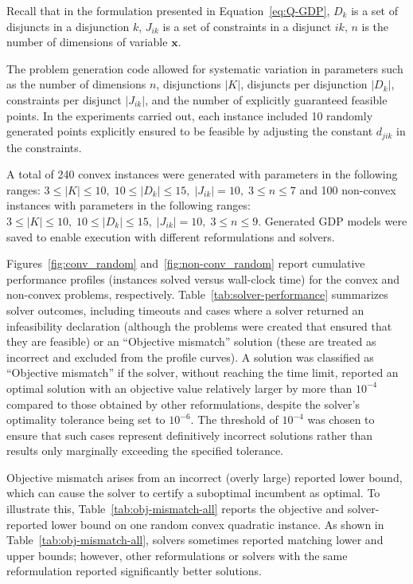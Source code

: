\documentclass[11pt]{article}
\begin{document}
Recall that in the formulation presented in Equation~\eqref{eq:Q-GDP}, $D_k$ is a set of disjuncts in a disjunction $k$, $J_{ik}$ is a set of constraints in a disjunct $ik$, $n$ is the number of dimensions of variable $\mathbf{x}$.

The problem generation code allowed for systematic variation in parameters such as the number of dimensions \(n\), disjunctions \(|K|\), disjuncts per disjunction \(|D_k|\), constraints per disjunct \(|J_{ik}|\), and the number of explicitly guaranteed feasible points.
In the experiments carried out, each instance included 10 randomly generated points explicitly ensured to be feasible by adjusting the constant \(d_{jik}\) in the constraints.

A total of 240 convex instances were generated with parameters in the following ranges:
\(
3 \leq |K| \leq 10, \; 10 \leq |D_k| \leq 15, \; |J_{ik}| = 10, \; 3 \leq n \leq 7
\) and 100 non-convex instances with parameters in the following ranges: \(
3 \leq |K| \leq 10, \; 10 \leq |D_k| \leq 15, \; |J_{ik}| = 10, \; 3 \leq n \leq 9
\).
Generated GDP models were saved to enable execution with different reformulations and solvers.

Figures~\ref{fig:conv_random} and~\ref{fig:non-conv_random} report cumulative performance profiles (instances solved versus wall-clock time) for the convex and non-convex problems, respectively.
Table~\ref{tab:solver-performance} summarizes solver outcomes, including timeouts and cases where a solver returned an infeasibility declaration (although the problems were created that ensured that they are feasible) or an ``Objective mismatch'' solution (these are treated as incorrect and excluded from the profile curves).
A solution was classified as ``Objective mismatch'' if the solver, without reaching the time limit, reported an optimal solution with an objective value relatively larger by more than \(10^{-4}\) compared to those obtained by other reformulations, despite the solver’s optimality tolerance being set to \(10^{-6}\). 
The threshold of \(10^{-4}\) was chosen to ensure that such cases represent definitively incorrect solutions rather than results only marginally exceeding the specified tolerance.

Objective mismatch arises from an incorrect (overly large) reported lower bound, which can cause the solver to certify a suboptimal incumbent as optimal.
To illustrate this, Table~\ref{tab:obj-mismatch-all} reports the objective and solver-reported lower bound on one random convex quadratic instance.
As shown in Table~\ref{tab:obj-mismatch-all}, solvers sometimes reported matching lower and upper bounds; however, other reformulations or solvers with the same reformulation reported significantly better solutions.
\end{document}
